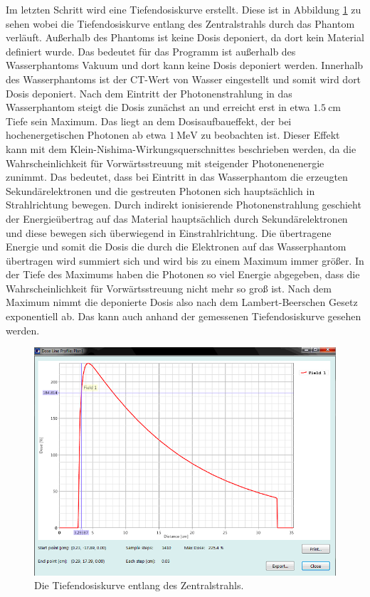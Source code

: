 Im letzten Schritt wird eine Tiefendosiskurve erstellt. Diese ist in Abbildung \ref{fig:aufgabe215} zu sehen wobei die Tiefendosiskurve entlang des Zentralstrahls durch das Phantom verläuft. Außerhalb des Phantoms ist keine Dosis deponiert, da dort kein Material
definiert wurde. Das bedeutet für das Programm ist außerhalb des Wasserphantoms Vakuum und
dort kann keine Dosis deponiert werden.
Innerhalb des Wasserphantoms ist der CT-Wert von Wasser eingestellt und somit wird dort
Dosis deponiert. Nach dem Eintritt der Photonenstrahlung in das Wasserphantom steigt die
Dosis zunächst an und erreicht erst in etwa $\SI{1.5}{\centi\meter}$ Tiefe sein Maximum.
Das liegt an dem Dosisaufbaueffekt, der bei hochenergetischen Photonen ab etwa
$\SI{1}{\mega\eV}$ zu beobachten ist. Dieser Effekt kann mit dem Klein-Nishima-Wirkungsquerschnittes beschrieben werden, da die Wahrscheinlichkeit für Vorwärtsstreuung
mit steigender Photonenenergie zunimmt. Das bedeutet, dass bei Eintritt in das
Wasserphantom die erzeugten Sekundärelektronen und die gestreuten Photonen sich
hauptsächlich in Strahlrichtung bewegen. Durch indirekt ionisierende Photonenstrahlung
geschieht der Energieübertrag auf das Material hauptsächlich durch Sekundärelektronen und
diese bewegen sich überwiegend in Einstrahlrichtung. Die übertragene Energie und somit die Dosis
die durch die Elektronen auf das Wasserphantom übertragen wird summiert sich und wird bis
zu einem Maximum immer größer. In der Tiefe des Maximums haben die Photonen so viel Energie
abgegeben, dass die Wahrscheinlichkeit für Vorwärtsstreuung nicht mehr so groß ist.
Nach dem Maximum nimmt die deponierte Dosis also nach dem Lambert-Beerschen Gesetz exponentiell
ab. Das kann auch anhand der gemessenen Tiefendosiskurve gesehen werden. \cite{grundlagen}


\begin{figure}[H]
	\centering
	\includegraphics[width=0.7\linewidth]{../../Wasserphantom Bilder/Aufgabe215.png}
	\caption{Die Tiefendosiskurve entlang des Zentralstrahls.}
	\label{fig:aufgabe215}
\end{figure}

